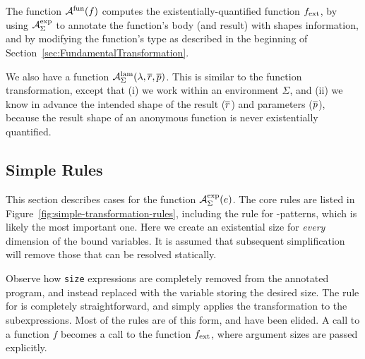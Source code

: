 The function \(\mathcal{A}^{\text{fun}}(f)\) computes the existentially-quantified 
function \(f_{\textrm{ext}}\), by using  \(\mathcal{A}_{\Sigma}^{\text{exp}}\) to annotate
the function's body (and result) with shapes information, and by modifying
the function's type as described in the beginning of
Section~\ref{sec:FundamentalTransformation}.

We also have a function
\(\mathcal{A}_{\Sigma}^{\text{lam}}(\lambda,\overline{r},\overline{p})\).  This is
similar to the function transformation, except that (i) we work within
an environment \(\Sigma\), and (ii) we know in advance the intended shape
of the result (\(\overline{r}\)) and parameters
(\(\overline{p}\)), because the result shape of an anonymous function
is never existentially quantified.

\subsection{Simple Rules}
\label{sec:SimpleRules}

This section describes cases for the function
\(\mathcal{A}_{\Sigma}^{\text{exp}}(e)\).  The core rules are listed in
Figure~\ref{fig:simple-transformation-rules}, including the rule for
-patterns, which is likely the most important one.  Here we
create an existential size for \textit{every} dimension of the bound
variables.  It is assumed that subsequent simplification will remove
those that can be resolved statically.

Observe how \texttt{size} expressions are completely removed from the
annotated program, and instead replaced with the variable storing the
desired size.  The rule for  is completely straightforward, and
simply applies the transformation to the subexpressions.  Most of the
rules are of this form, and have been elided.  A call to a function
\(f\) becomes a call to the function \(f_{\textrm{ext}}\), where argument
sizes are passed explicitly.

